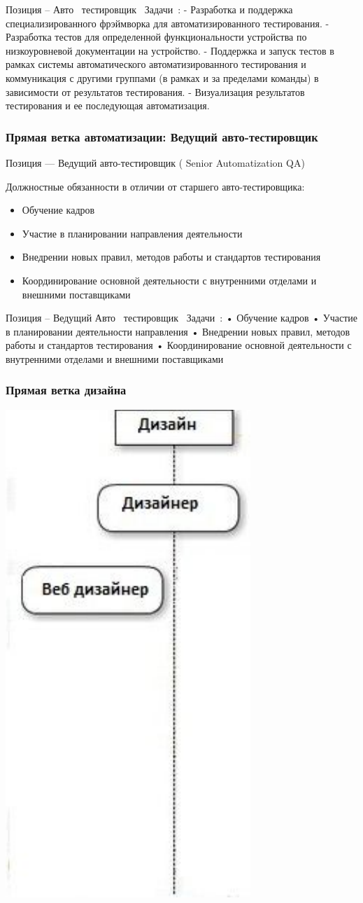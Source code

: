 \documentclass{../industrial-development}
\begin{document}
{\lecturenotes
Позиция – Авто~\cite{hh} тестировщик~\cite{itcf}
Задачи~\cite{rab}:
- Разработка и поддержка специализированного фрэймворка для автоматизированного тестирования.
- Разработка тестов для определенной функциональности устройства по низкоуровневой документации на устройство.
- Поддержка и запуск тестов в рамках системы автоматического автоматизированного тестирования и коммуникация с другими группами (в рамках и за пределами команды) в зависимости от результатов тестирования.
- Визуализация результатов тестирования и ее последующая автоматизация.

\begin{frame} \frametitle{Прямая ветка автоматизации: Ведущий авто-тестировщик }
 \begin{block}{}
  \alert{Позиция --- Ведущий авто-тестировщик ( Senior Automatization QA)}

Должностные обязанности в отличии от старшего авто-тестировщика: 
  \end{block}
  \begin{itemize}
  \item Обучение кадров
  \item  Участие в планировании направления деятельности
  \item Внедрении новых правил, методов работы и стандартов тестирования
 \item Координирование основной деятельности с внутренними отделами и внешними поставщиками
  \end{itemize}
\end{frame}

\lecturenotes
Позиция – Ведущий Авто~\cite{hh} тестировщик~\cite{itcf}
Задачи~\cite{rab}:
•	Обучение кадров
•	Участие в планировании деятельности направления
•	Внедрении новых правил, методов работы и стандартов тестирования
•	Координирование основной деятельности с внутренними отделами и внешними поставщиками

\begin{frame} \frametitle{Прямая ветка дизайна }
  \centerline{\includegraphics[width=0.27\linewidth]{11-IT-specialist's-way/sch11d.pdf}}
\end{frame}

}
\end{document}
